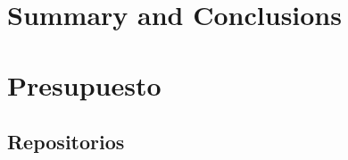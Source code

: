 \documentclass[spanish,a4paper,14pt,oneside]{extreport}
\begin{document}


\newpage{\pagestyle{empty}}
\thispagestyle{empty}

\chapter{Summary and Conclusions}
\label{chapter:ingles}



\newpage{\pagestyle{empty}}
\thispagestyle{empty}

\chapter{Presupuesto}
\label{chapter:Presupuesto}




\newpage{\pagestyle{empty}}
\thispagestyle{empty}
\begin{appendix}

\chapter{Repositorios}
\label{appendix:1}


\end{appendix}




\nocite{*}

\end{document}
